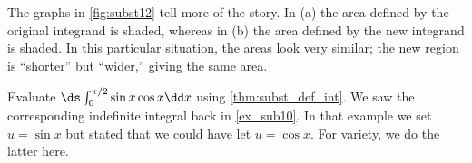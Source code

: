 \begin{example}
The graphs in \autoref{fig:subst12} tell more of the story. In (a) the area defined by the original integrand is shaded, whereas in (b) the area defined by the new integrand is shaded. In this particular situation, the areas look very similar; the new region is ``shorter'' but ``wider,'' giving the same area.
\end{example}

\begin{example}\label{ex_subst13}
Evaluate $\ds \int_0^{\pi/2} \sin x \cos x\dd x$ using \autoref{thm:subst_def_int}.
\solution
We saw the corresponding indefinite integral back in \autoref{ex_sub10}. In that example we set $u = \sin x$ but stated that we could have let $u = \cos x$. For variety, we do the latter here.


\end{example}
